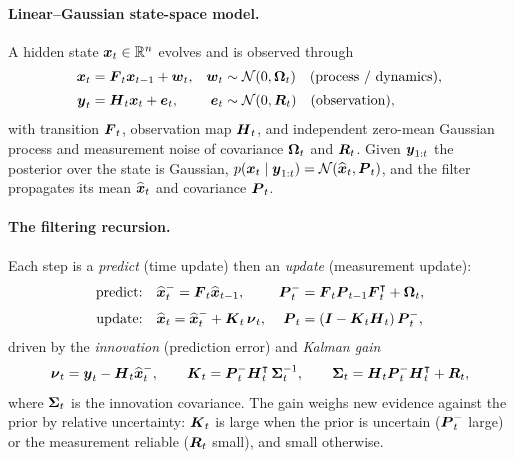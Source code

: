 \documentclass{article} %
\begin{document}
\paragraph{Linear--Gaussian state-space model.}
A hidden state $\boldsymbol{x}_t\in\mathbb{R}^n$ evolves and is observed through
\begin{equation}
\begin{aligned}
  \boldsymbol{x}_t &= \boldsymbol{F}_t \boldsymbol{x}_{t-1} + \boldsymbol{w}_t,
  & \boldsymbol{w}_t &\sim \mathcal N(0,\boldsymbol{\Omega}_t)\quad\text{(process / dynamics)},\\[2pt]
  \boldsymbol{y}_t &= \boldsymbol{H}_t \boldsymbol{x}_t + \boldsymbol{e}_t,
  & \boldsymbol{e}_t &\sim \mathcal N(0,\boldsymbol{R}_t)\quad\text{(observation)},
\end{aligned}
\label{eq:kf-ssm}
\end{equation}
with transition $\boldsymbol{F}_t$, observation map $\boldsymbol{H}_t$, and independent zero-mean Gaussian
process and measurement noise of covariance $\boldsymbol{\Omega}_t$ and $\boldsymbol{R}_t$. Given $\boldsymbol{y}_{1:t}$ the
posterior over the state is Gaussian, $p(\boldsymbol{x}_t\mid \boldsymbol{y}_{1:t})=\mathcal N(\widehat{\boldsymbol{x}}_t,\boldsymbol{P}_t)$, and the
filter propagates its mean $\widehat{\boldsymbol{x}}_t$ and covariance $\boldsymbol{P}_t$.

\paragraph{The filtering recursion.}
Each step is a \emph{predict} (time update) then an \emph{update} (measurement update):
\begin{equation}
\begin{aligned}
  \text{predict:}\quad & \widehat{\boldsymbol{x}}_t^- = \boldsymbol{F}_t \widehat{\boldsymbol{x}}_{t-1},
  & \boldsymbol{P}_t^- &= \boldsymbol{F}_t \boldsymbol{P}_{t-1} \boldsymbol{F}_t^{\intercal} + \boldsymbol{\Omega}_t,\\[2pt]
  \text{update:}\quad  & \widehat{\boldsymbol{x}}_t = \widehat{\boldsymbol{x}}_t^- + \boldsymbol{K}_t\,\boldsymbol{\nu}_t,
  & \boldsymbol{P}_t &= (\boldsymbol{I} - \boldsymbol{K}_t \boldsymbol{H}_t)\,\boldsymbol{P}_t^-,
\end{aligned}
\label{eq:kf-rec}
\end{equation}
driven by the \emph{innovation} (prediction error) and \emph{Kalman gain}
\begin{equation}
  \boldsymbol{\nu}_t = \boldsymbol{y}_t - \boldsymbol{H}_t \widehat{\boldsymbol{x}}_t^-, \qquad
  \boldsymbol{K}_t = \boldsymbol{P}_t^- \boldsymbol{H}_t^{\intercal}\,\boldsymbol{\Sigma}_t^{-1}, \qquad
  \boldsymbol{\Sigma}_t = \boldsymbol{H}_t \boldsymbol{P}_t^- \boldsymbol{H}_t^{\intercal} + \boldsymbol{R}_t ,
  \label{eq:kf-gain}
\end{equation}
where $\boldsymbol{\Sigma}_t$ is the innovation covariance. The gain weighs new evidence against
the prior by relative uncertainty: $\boldsymbol{K}_t$ is large when the prior is uncertain ($\boldsymbol{P}_t^-$
large) or the measurement reliable ($\boldsymbol{R}_t$ small), and small otherwise.
\end{document}
